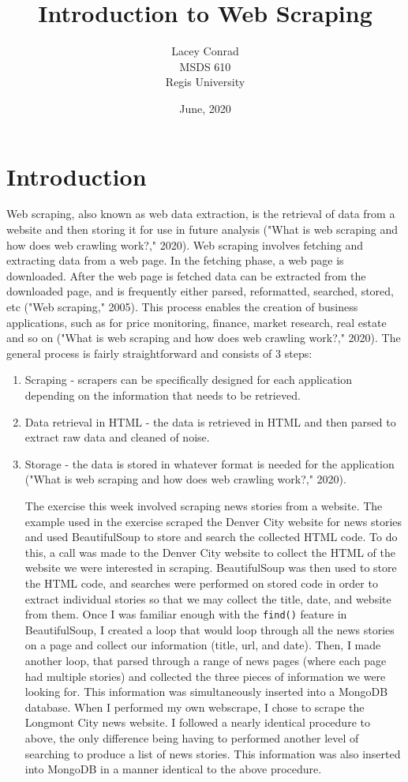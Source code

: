 \documentclass[]{article}
\title{Introduction to Web Scraping}
\author{Lacey Conrad\\MSDS 610\\ Regis University}
\date{June, 2020}
\newcommand{\code}[1]{\colorbox{light-gray}{\texttt{#1}}}
\begin{document}
	\maketitle
	
\section{Introduction}
	Web scraping, also known as web data extraction, is the retrieval of data from a website and then storing it for use in future analysis ("What is web scraping and how does web crawling work?," 2020).  Web scraping involves fetching and extracting data from a web page.  In the fetching phase, a web page is downloaded.  After the web page is fetched data can be extracted from the downloaded page, and is frequently either parsed, reformatted, searched, stored, etc ("Web scraping," 2005).  This process enables the creation of business applications, such as for price monitoring, finance, market research, real estate and so on ("What is web scraping and how does web crawling work?," 2020).  The general process is fairly straightforward and consists of 3 steps:
\begin{enumerate}
	\item Scraping - scrapers can be specifically designed for each application depending on the information that needs to be retrieved.
	\item Data retrieval in HTML - the data is retrieved in HTML and then parsed to extract raw data and cleaned of noise.
	\item Storage - the data is stored in whatever format is needed for the application ("What is web scraping and how does web crawling work?," 2020).
	
The exercise this week involved scraping news stories from a website.  The example used in the exercise scraped the Denver City website for news stories and used BeautifulSoup to store and search the collected HTML code.  To do this, a call was made to the Denver City website to collect the HTML of the website we were interested in scraping.  BeautifulSoup was then used to store the HTML code, and searches were performed on stored code in order to extract individual stories so that we may collect the title, date, and website from them.  Once I was familiar enough with the \code{find()} feature in BeautifulSoup, I created a loop that would loop through all the news stories on a page and collect our information (title, url, and date).  Then, I made another loop, that parsed through a range of news pages (where each page had multiple stories) and collected the three pieces of information we were looking for.  This information was simultaneously inserted into a MongoDB database.  When I performed my own webscrape, I chose to scrape the Longmont City news website.  I followed a nearly identical procedure to above, the only difference being having to performed another level of searching to produce a list of news stories.  This information was also inserted into MongoDB in a manner identical to the above procedure.
\end{enumerate}
\end{document}
